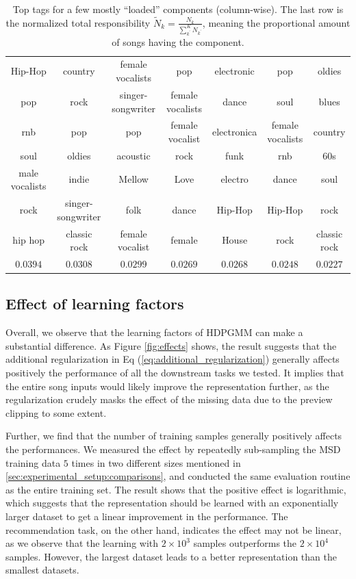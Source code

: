 \documentclass{article}
\begin{document}
\begin{table}[ht]
\centering
\small
\begin{tabular}{ ccccccc }
    \hline
    Hip-Hop & country & female vocalists & pop & electronic & pop & oldies \\
    pop & rock & singer-songwriter & female vocalists & dance & soul & blues \\
    rnb & pop & pop & female vocalist & electronica & female vocalists & country \\
    soul & oldies & acoustic & rock & funk & rnb & 60s \\
    male vocalists & indie & Mellow & Love & electro & dance & soul \\
    rock & singer-songwriter & folk & dance & Hip-Hop & Hip-Hop & rock \\
    hip hop & classic rock & female vocalist & female & House & rock & classic rock \\
    \hline
    $0.0394$ & $0.0308$ & $0.0299$ & $0.0269$ & $0.0268$ & $0.0248$ & $0.0227$ \\
    \hline
\end{tabular}
\caption{Top tags for a few mostly ``loaded'' components (column-wise). The last row is the normalized total responsibility $\tilde{N}_{k} = \frac{N_{k}}{\sum_{k^{\prime}}^{K} N_{k^{\prime}}}$, meaning the proportional amount of songs having the component.}
\label{tab:topic_tags}
\end{table}


\subsection{Effect of learning factors}\label{sec:result_discussion:learning_factors}

Overall, we observe that the learning factors of HDPGMM can make a substantial difference. As Figure \ref{fig:effects} shows, the result suggests that the additional regularization in Eq (\ref{eq:additional_regularization}) generally affects positively the performance of all the downstream tasks we tested. It implies that the entire song inputs would likely improve the representation further, as the regularization crudely masks the effect of the missing data due to the preview clipping to some extent.

Further, we find that the number of training samples generally positively affects the performances. We measured the effect by repeatedly sub-sampling the MSD training data $5$ times in two different sizes mentioned in \ref{sec:experimental_setup:comparisons}, and conducted the same evaluation routine as the entire training set. The result shows that the positive effect is logarithmic, which suggests that the representation should be learned with an exponentially larger dataset to get a linear improvement in the performance. The recommendation task, on the other hand, indicates the effect may not be linear, as we observe that the learning with $2\times10^{3}$ samples outperforms the $2\times10^{4}$ samples. However, the largest dataset leads to a better representation than the smallest datasets.
\end{document}
